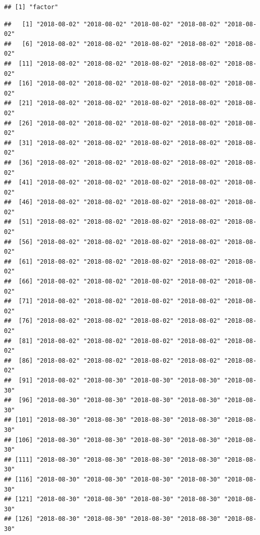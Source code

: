 \documentclass[]{article}
\newenvironment{Shaded}{\begin{snugshade}}{\end{snugshade}}
\newcommand{\KeywordTok}[1]{\textcolor[rgb]{0.13,0.29,0.53}{\textbf{#1}}}
\newcommand{\StringTok}[1]{\textcolor[rgb]{0.31,0.60,0.02}{#1}}
\newcommand{\OperatorTok}[1]{\textcolor[rgb]{0.81,0.36,0.00}{\textbf{#1}}}
\newcommand{\NormalTok}[1]{#1}
\begin{document}
\begin{verbatim}
## [1] "factor"
\end{verbatim}

\begin{Shaded}
\end{Shaded}

\begin{verbatim}
##   [1] "2018-08-02" "2018-08-02" "2018-08-02" "2018-08-02" "2018-08-02"
##   [6] "2018-08-02" "2018-08-02" "2018-08-02" "2018-08-02" "2018-08-02"
##  [11] "2018-08-02" "2018-08-02" "2018-08-02" "2018-08-02" "2018-08-02"
##  [16] "2018-08-02" "2018-08-02" "2018-08-02" "2018-08-02" "2018-08-02"
##  [21] "2018-08-02" "2018-08-02" "2018-08-02" "2018-08-02" "2018-08-02"
##  [26] "2018-08-02" "2018-08-02" "2018-08-02" "2018-08-02" "2018-08-02"
##  [31] "2018-08-02" "2018-08-02" "2018-08-02" "2018-08-02" "2018-08-02"
##  [36] "2018-08-02" "2018-08-02" "2018-08-02" "2018-08-02" "2018-08-02"
##  [41] "2018-08-02" "2018-08-02" "2018-08-02" "2018-08-02" "2018-08-02"
##  [46] "2018-08-02" "2018-08-02" "2018-08-02" "2018-08-02" "2018-08-02"
##  [51] "2018-08-02" "2018-08-02" "2018-08-02" "2018-08-02" "2018-08-02"
##  [56] "2018-08-02" "2018-08-02" "2018-08-02" "2018-08-02" "2018-08-02"
##  [61] "2018-08-02" "2018-08-02" "2018-08-02" "2018-08-02" "2018-08-02"
##  [66] "2018-08-02" "2018-08-02" "2018-08-02" "2018-08-02" "2018-08-02"
##  [71] "2018-08-02" "2018-08-02" "2018-08-02" "2018-08-02" "2018-08-02"
##  [76] "2018-08-02" "2018-08-02" "2018-08-02" "2018-08-02" "2018-08-02"
##  [81] "2018-08-02" "2018-08-02" "2018-08-02" "2018-08-02" "2018-08-02"
##  [86] "2018-08-02" "2018-08-02" "2018-08-02" "2018-08-02" "2018-08-02"
##  [91] "2018-08-02" "2018-08-30" "2018-08-30" "2018-08-30" "2018-08-30"
##  [96] "2018-08-30" "2018-08-30" "2018-08-30" "2018-08-30" "2018-08-30"
## [101] "2018-08-30" "2018-08-30" "2018-08-30" "2018-08-30" "2018-08-30"
## [106] "2018-08-30" "2018-08-30" "2018-08-30" "2018-08-30" "2018-08-30"
## [111] "2018-08-30" "2018-08-30" "2018-08-30" "2018-08-30" "2018-08-30"
## [116] "2018-08-30" "2018-08-30" "2018-08-30" "2018-08-30" "2018-08-30"
## [121] "2018-08-30" "2018-08-30" "2018-08-30" "2018-08-30" "2018-08-30"
## [126] "2018-08-30" "2018-08-30" "2018-08-30" "2018-08-30" "2018-08-30"

\end{verbatim}
\end{document}
